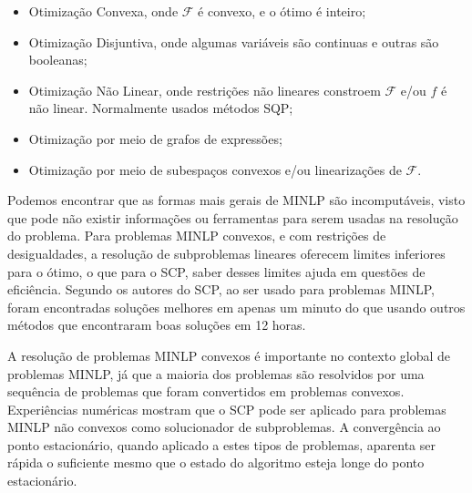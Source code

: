\begin{itemize}
\item Otimização Convexa, onde \( \mathcal{F} \) é convexo, e o ótimo é inteiro;
\item Otimização Disjuntiva, onde algumas variáveis são continuas e outras são booleanas;
\item Otimização Não Linear, onde restrições não lineares constroem \(\mathcal{F}\) e/ou \(f\) é não linear. Normalmente usados métodos SQP;
\item Otimização por meio de grafos de expressões;
\item Otimização por meio de subespaços convexos e/ou linearizações de \(\mathcal{F}\).
\end{itemize}

Podemos encontrar que as formas mais gerais de MINLP são incomputáveis, visto que pode não existir
informações ou ferramentas para serem usadas na resolução do problema. Para problemas MINLP convexos,
e com restrições de desigualdades, a resolução de subproblemas lineares oferecem limites inferiores para
o ótimo, o que para o SCP, saber desses limites ajuda em questões de eficiência. Segundo os autores do
SCP, ao ser usado para problemas MINLP, foram encontradas soluções melhores em apenas um minuto do que
usando outros métodos que encontraram boas soluções em 12 horas.

A resolução de problemas MINLP convexos é importante no contexto global de problemas MINLP, já
que a maioria dos problemas são resolvidos por uma sequência de problemas que foram convertidos em
problemas convexos. Experiências numéricas mostram que o SCP pode ser aplicado para problemas MINLP
não convexos como solucionador de subproblemas. A convergência ao ponto estacionário, quando aplicado
a estes tipos de problemas, aparenta ser rápida o suficiente mesmo que o estado do algoritmo esteja
longe do ponto estacionário.